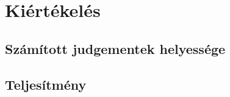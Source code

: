 \chapter{Kiértékelés}


\section{Számított judgementek helyessége}



\section{Teljesítmény}







